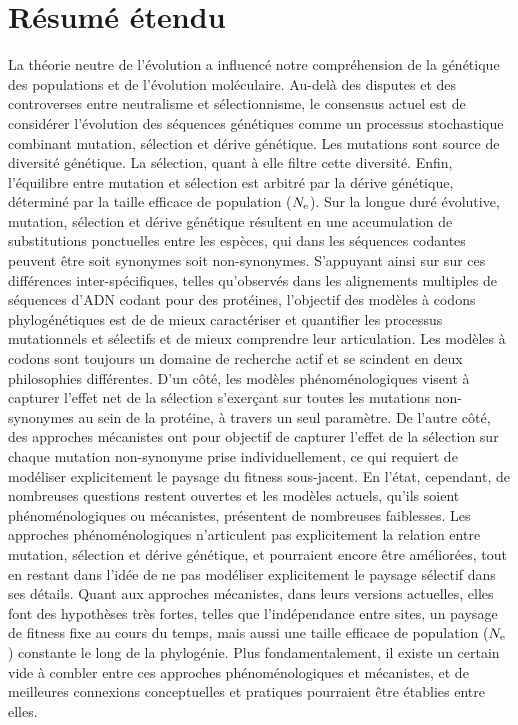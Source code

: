 \newpage
\section*{Résumé étendu}

La théorie neutre de l’évolution a influencé notre compréhension de la génétique des populations et de l'évolution moléculaire.
Au-delà des disputes et des controverses entre neutralisme et sélectionnisme, le consensus actuel est de considérer l'évolution des séquences génétiques comme un processus stochastique combinant mutation, sélection et dérive génétique.
Les mutations sont source de diversité génétique.
La sélection, quant à elle filtre cette diversité.
Enfin, l'équilibre entre mutation et sélection est arbitré par la dérive génétique, déterminé par la taille efficace de population ($N_{\textrm{e}}$).
Sur la longue duré évolutive, mutation, sélection et dérive génétique résultent en une accumulation de substitutions ponctuelles entre les espèces, qui dans les séquences codantes peuvent être soit synonymes soit non-synonymes.
S'appuyant ainsi sur sur ces différences inter-spécifiques, telles qu'observés dans les alignements multiples de séquences d’ADN codant pour des protéines, l'objectif des modèles à codons phylogénétiques est de de mieux caractériser et quantifier les processus mutationnels et sélectifs et de mieux comprendre leur articulation.
Les modèles à codons sont toujours un domaine de recherche actif et se scindent en deux philosophies différentes.
D'un côté, les modèles phénoménologiques visent à capturer l'effet net de la sélection s'exerçant sur toutes les mutations non-synonymes au sein de la protéine, à travers un seul paramètre.
De l'autre côté, des approches mécanistes ont pour objectif de capturer l'effet de la sélection sur chaque mutation non-synonyme prise individuellement, ce qui requiert de modéliser explicitement le paysage du fitness sous-jacent.
En l'état, cependant, de nombreuses questions restent ouvertes et les modèles actuels, qu'ils soient phénoménologiques ou mécanistes, présentent de nombreuses faiblesses.
Les approches phénoménologiques n'articulent pas explicitement la relation entre mutation, sélection et dérive génétique, et pourraient encore être améliorées, tout en restant dans l'idée de ne pas modéliser explicitement le paysage sélectif dans ses détails.
Quant aux approches mécanistes, dans leurs versions actuelles, elles font des hypothèses très fortes, telles que l'indépendance entre sites, un paysage de fitness fixe au cours du temps, mais aussi une taille efficace de population ($N_{\textrm{e}}$) constante le long de la phylogénie.
Plus fondamentalement, il existe un certain vide à combler entre ces approches phénoménologiques et mécanistes, et de meilleures connexions conceptuelles et pratiques pourraient être établies entre elles.

